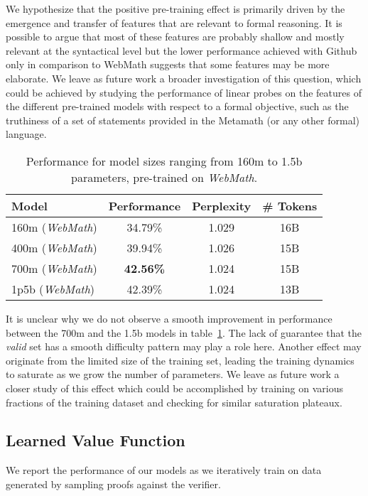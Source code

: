 \documentclass{article}
\begin{document}
We hypothesize that the positive pre-training effect is primarily driven by the emergence and transfer of features that are relevant to formal reasoning. It is possible to argue that most of these features are probably shallow and mostly relevant at the syntactical level but the lower performance achieved with Github only in comparison to WebMath suggests that some features may be more elaborate. We leave as future work a broader investigation of this question, which could be achieved by studying the performance of linear probes on the
features of the different pre-trained models with respect to a formal objective, such as the truthiness of a set of statements provided in the Metamath (or any other formal) language.

\begin{table}[ht]
\caption{Performance for model sizes ranging from 160m to 1.5b parameters, pre-trained on \textit{WebMath}.} 
\centering
\begin{tabular}{ |l|c|c|c| }
    \hline
    Model & Performance & Perplexity & \# Tokens \\
    \hline
    160m (\textit{WebMath}) & 34.79\% & 1.029 & 16B \\
    400m (\textit{WebMath}) & 39.94\% & 1.026 & 15B \\
    700m (\textit{WebMath}) & \textbf{42.56\%} & 1.024 & 15B \\
    1p5b (\textit{WebMath}) & 42.39\% & 1.024 & 13B \\
    \hline
\end{tabular}
\label{table:webmath}
\end{table}

It is unclear why we do not observe a smooth improvement in performance between the 700m and the 1.5b models in table~\ref{table:webmath}. The lack of guarantee that the \textit{valid} set has a smooth difficulty pattern may play a role here. Another effect may originate from the limited size of the training set, leading the training dynamics to saturate as we grow the number of parameters. We leave as future work a closer study of this effect which could be accomplished by training on various fractions of the training dataset and checking for similar saturation plateaux.

\subsection{Learned Value Function}

We report the performance of our models as we iteratively train on data generated by sampling proofs against the verifier.
\end{document}
